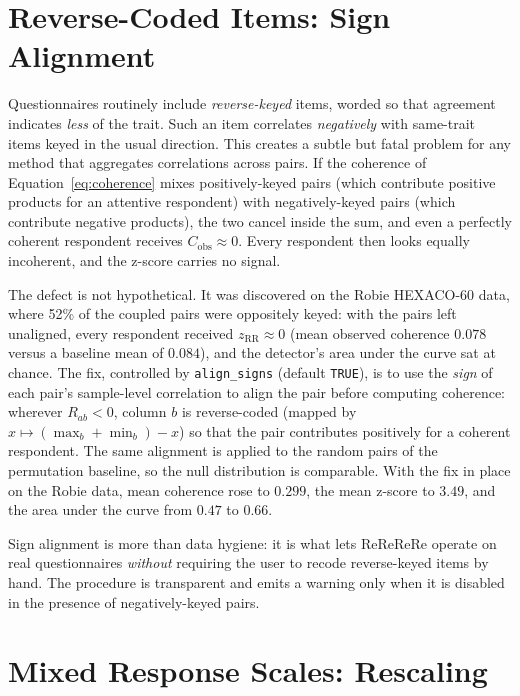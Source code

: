 \documentclass[doc,11pt,donotrepeattitle]{apa7}
\begin{document}
\section{Reverse-Coded Items: Sign Alignment}

Questionnaires routinely include \emph{reverse-keyed} items, worded so that
agreement indicates \emph{less} of the trait. Such an item correlates
\emph{negatively} with same-trait items keyed in the usual direction. This
creates a subtle but fatal problem for any method that aggregates correlations
across pairs. If the coherence of Equation~\ref{eq:coherence} mixes
positively-keyed pairs (which contribute positive products for an attentive
respondent) with negatively-keyed pairs (which contribute negative products),
the two cancel inside the sum, and even a perfectly coherent respondent receives
$C_{\text{obs}} \approx 0$. Every respondent then looks equally incoherent, and
the z-score carries no signal.

The defect is not hypothetical. It was discovered on the Robie HEXACO-60 data,
where 52\% of the coupled pairs were oppositely keyed: with the pairs left
unaligned, every respondent received $z_{\text{RR}} \approx 0$ (mean observed
coherence $0.078$ versus a baseline mean of $0.084$), and the detector's area
under the curve sat at chance. The fix, controlled by \texttt{align\_signs}
(default \texttt{TRUE}), is to use the \emph{sign} of each pair's sample-level
correlation to align the pair before computing coherence: wherever
$R_{ab} < 0$, column $b$ is reverse-coded (mapped by
$x \mapsto (\max_b + \min_b) - x$) so that the pair contributes positively for a
coherent respondent. The same alignment is applied to the random pairs of the
permutation baseline, so the null distribution is comparable. With the fix in
place on the Robie data, mean coherence rose to $0.299$, the mean z-score to
$3.49$, and the area under the curve from $0.47$ to $0.66$.

Sign alignment is more than data hygiene: it is what lets ReReReRe operate on
real questionnaires \emph{without} requiring the user to recode reverse-keyed
items by hand. The procedure is transparent and emits a warning only when it is
disabled in the presence of negatively-keyed pairs.

\section{Mixed Response Scales: Rescaling}
\end{document}
